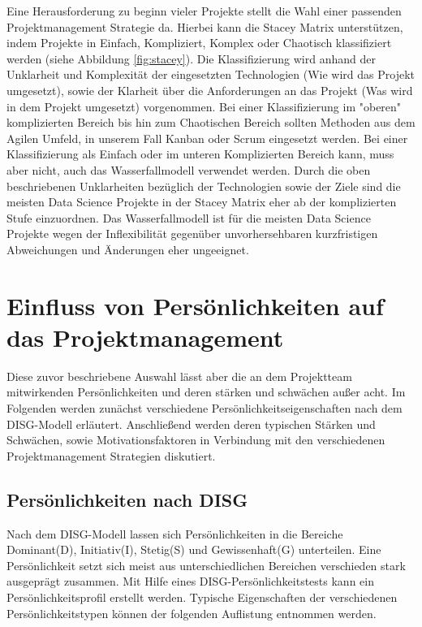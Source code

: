\documentclass[twocolumn,10pt]{asme2ej}
\begin{document}
Eine Herausforderung zu beginn vieler Projekte stellt die Wahl einer passenden Projektmanagement Strategie da. Hierbei kann die Stacey Matrix \cite{Stacey2011StrategicMA} unterstützen, indem Projekte in Einfach, Kompliziert, Komplex oder Chaotisch klassifiziert werden (siehe Abbildung \ref{fig:stacey}). Die Klassifizierung wird anhand der Unklarheit und Komplexität der eingesetzten Technologien (Wie wird das Projekt umgesetzt), sowie der Klarheit über die Anforderungen an das Projekt (Was wird in dem Projekt umgesetzt) vorgenommen. Bei einer Klassifizierung im "oberen" komplizierten Bereich bis hin zum Chaotischen Bereich sollten Methoden aus dem Agilen Umfeld, in unserem Fall Kanban oder Scrum eingesetzt werden. Bei einer Klassifizierung als Einfach oder im unteren Komplizierten Bereich kann, muss aber nicht, auch das Wasserfallmodell verwendet werden. Durch die oben beschriebenen Unklarheiten bezüglich der Technologien sowie der Ziele sind die meisten Data Science Projekte in der Stacey Matrix eher ab der komplizierten Stufe einzuordnen. Das Wasserfallmodell ist für die meisten Data Science Projekte wegen der Inflexibilität gegenüber unvorhersehbaren kurzfristigen Abweichungen und Änderungen  eher ungeeignet.

\section{Einfluss von Persönlichkeiten auf das Projektmanagement}\label{sec:2}
Diese zuvor beschriebene Auswahl lässt aber die an dem Projektteam mitwirkenden Persönlichkeiten und deren stärken und schwächen außer acht. Im Folgenden werden zunächst verschiedene Persönlichkeitseigenschaften nach dem DISG-Modell erläutert. Anschließend werden deren typischen Stärken und Schwächen, sowie Motivationsfaktoren in Verbindung mit den verschiedenen Projektmanagement Strategien diskutiert.

\subsection{Persönlichkeiten nach DISG}
Nach dem DISG-Modell \cite{disc} lassen sich Persönlichkeiten in die Bereiche Dominant(D), Initiativ(I), Stetig(S) und Gewissenhaft(G) unterteilen. Eine Persönlichkeit setzt sich meist aus unterschiedlichen Bereichen verschieden stark ausgeprägt zusammen. Mit Hilfe eines DISG-Persönlichkeitstests kann ein Persönlichkeitsprofil erstellt werden. Typische Eigenschaften der verschiedenen Persönlichkeitstypen können der folgenden Auflistung entnommen werden.
\end{document}
